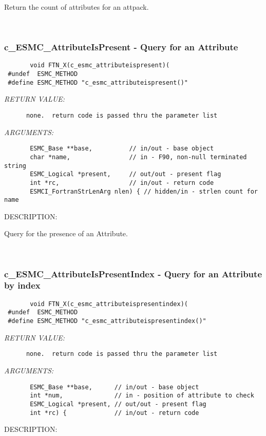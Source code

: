      Return the count of attributes for an attpack.
   
 
\mbox{}\hrulefill\ 
 
\subsubsection [c\_ESMC\_AttributeIsPresent] {c\_ESMC\_AttributeIsPresent - Query for an Attribute}


  
\begin{verbatim}       void FTN_X(c_esmc_attributeispresent)(
 #undef  ESMC_METHOD
 #define ESMC_METHOD "c_esmc_attributeispresent()"\end{verbatim}{\em RETURN VALUE:}
\begin{verbatim}      none.  return code is passed thru the parameter list\end{verbatim}{\em ARGUMENTS:}
\begin{verbatim}       ESMC_Base **base,          // in/out - base object
       char *name,                // in - F90, non-null terminated string
       ESMC_Logical *present,     // out/out - present flag
       int *rc,                   // in/out - return code
       ESMCI_FortranStrLenArg nlen) { // hidden/in - strlen count for name\end{verbatim}
{\sf DESCRIPTION:\\ }


       Query for the presence of an Attribute.
   
 
\mbox{}\hrulefill\ 
 
\subsubsection [c\_ESMC\_AttributeIsPresentIndex] {c\_ESMC\_AttributeIsPresentIndex - Query for an Attribute by index}


  
\begin{verbatim}       void FTN_X(c_esmc_attributeispresentindex)(
 #undef  ESMC_METHOD
 #define ESMC_METHOD "c_esmc_attributeispresentindex()"\end{verbatim}{\em RETURN VALUE:}
\begin{verbatim}      none.  return code is passed thru the parameter list
   \end{verbatim}{\em ARGUMENTS:}
\begin{verbatim}       ESMC_Base **base,      // in/out - base object
       int *num,              // in - position of attribute to check
       ESMC_Logical *present, // out/out - present flag
       int *rc) {             // in/out - return code
   \end{verbatim}
{\sf DESCRIPTION:\\ }


